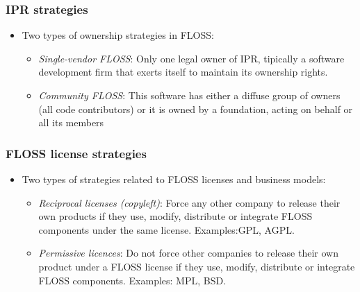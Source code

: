 \begin{frame}
 \frametitle{IPR strategies}
\begin{itemize}
 \item Two types of ownership strategies in FLOSS:
 \begin{itemize}
  \item \textit{Single-vendor FLOSS}: Only one legal owner of IPR, tipically a software development firm
that exerts itself to maintain its ownership rights.
  \item \textit{Community FLOSS}: This software has either a diffuse group of owners (all code contributors)
or it is owned by a foundation, acting on behalf or all its members
 \end{itemize}
\end{itemize}

\end{frame}


\begin{frame}
 \frametitle{FLOSS license strategies}
\begin{itemize}
 \item Two types of strategies related to FLOSS licenses and business models:
 \begin{itemize}
  \item \textit{Reciprocal licenses (\textit{copyleft})}: Force any other company to release their own
products if they use, modify, distribute or integrate FLOSS components under the same license. 
Examples:GPL, AGPL.
  \item \textit{Permissive licences}: Do not force other companies to release their own product under a FLOSS
license if they use, modify, distribute or integrate FLOSS components. Examples: MPL, BSD.
 \end{itemize}
\end{itemize}

\end{frame}


